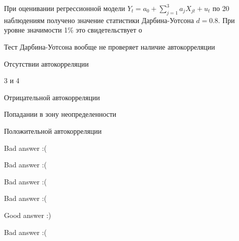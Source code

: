 
\begin{question}
При оценивании регрессионной модели \(Y_t = a_0 + \sum_{j=1}^3 a_j X_{jt} + u_t\) по 20 наблюдениям получено значение статистики Дарбина-Уотсона \(d = 0.8\). При уровне значимости 1\% это свидетельствует о
\begin{answerlist}
  \item Тест Дарбина-Уотсона вообще не проверяет наличие автокорреляции
  \item Отсутствии автокорреляции
  \item 3 и 4
  \item Отрицательной автокорреляции
  \item Попадании в зону неопределенности
  \item Положительной автокорреляции
\end{answerlist}
\end{question}

\begin{solution}
\begin{answerlist}
  \item Bad answer :(
  \item Bad answer :(
  \item Bad answer :(
  \item Bad answer :(
  \item Good answer :)
  \item Bad answer :(
\end{answerlist}
\end{solution}

